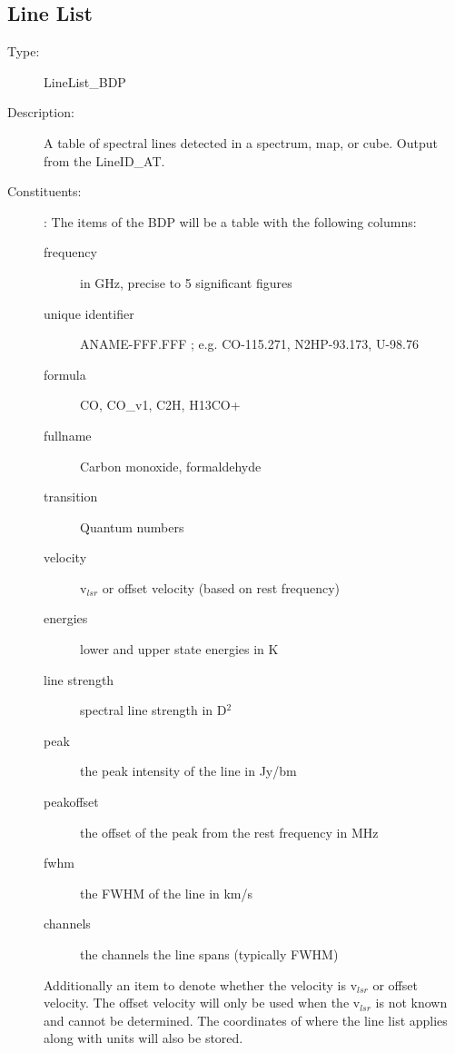 \subsection{Line List}
\begin{description}
\item[Type:] LineList\_BDP

\item[Description:]
A table of spectral lines detected in a spectrum, map, or cube. Output from the LineID\_AT.

\item[Constituents:]:
The items of the BDP will be a table with the following columns:

\begin{description}
\item[frequency] in GHz, precise to 5 significant figures
\item[unique identifier] ANAME-FFF.FFF ; e.g.  CO-115.271,   N2HP-93.173,   U-98.76
\item[formula] CO, CO\_v1, C2H, H13CO+
\item[fullname] Carbon monoxide, formaldehyde
\item[transition] Quantum numbers
\item[velocity] v$_{lsr}$ or offset velocity (based on rest frequency)
\item[energies] lower and upper state energies in K
\item[line strength] spectral line strength in D$^2$
\item[peak] the peak intensity of the line in Jy/bm
\item[peakoffset] the offset of the peak from the rest frequency in MHz
\item[fwhm] the FWHM of the line in km/s
\item[channels] the channels the line spans (typically FWHM)
\end{description}
Additionally an item to denote whether the velocity is v$_{lsr}$ or offset velocity. The offset velocity will only be used when the v$_{lsr}$ is not known and cannot be determined. The coordinates of where the line list applies along with units will also be stored.

\end{description}
